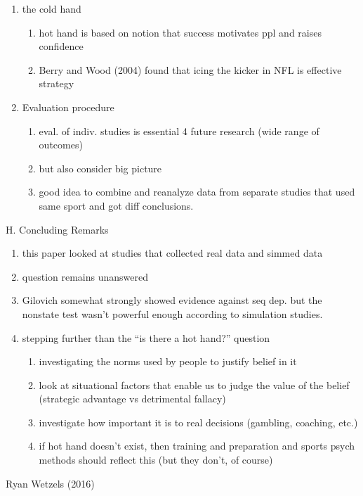 \documentclass[12pt,twoside]{dukestatscithesis}
\providecommand{\tightlist}{%
  \setlength{\itemsep}{0pt}\setlength{\parskip}{0pt}}
\theoremstyle{definition}
\theoremstyle{definition}
\theoremstyle{definition}
\theoremstyle{remark}
\begin{document}
\begin{enumerate}
\item
  the cold hand
  \begin{enumerate}
  \def\labelenumii{\alph{enumii}.}
  \tightlist
  \item
    hot hand is based on notion that success motivates ppl and raises
    confidence
  \item
    Berry and Wood (2004) found that icing the kicker in NFL is
    effective strategy
  \end{enumerate}
\item
  Evaluation procedure
  \begin{enumerate}
  \def\labelenumii{\alph{enumii}.}
  \tightlist
  \item
    eval. of indiv. studies is essential 4 future research (wide range
    of outcomes)
  \item
    but also consider big picture
  \item
    good idea to combine and reanalyze data from separate studies that
    used same sport and got diff conclusions.
  \end{enumerate}
\end{enumerate}
H. Concluding Remarks
\begin{enumerate}
\def\labelenumi{\arabic{enumi}.}
\tightlist
\item
  this paper looked at studies that collected real data and simmed data
\item
  question remains unanswered
\item
  Gilovich somewhat strongly showed evidence against seq dep. but the
  nonstate test wasn't powerful enough according to simulation studies.
\item
  stepping further than the ``is there a hot hand?'' question
  \begin{enumerate}
  \def\labelenumii{\alph{enumii}.}
  \tightlist
  \item
    investigating the norms used by people to justify belief in it
  \item
    look at situational factors that enable us to judge the value of the
    belief (strategic advantage vs detrimental fallacy)
  \item
    investigate how important it is to real decisions (gambling,
    coaching, etc.)
  \item
    if hot hand doesn't exist, then training and preparation and sports
    psych methods should reflect this (but they don't, of course)
  \end{enumerate}
\end{enumerate}
Ryan Wetzels (2016)
\end{document}
